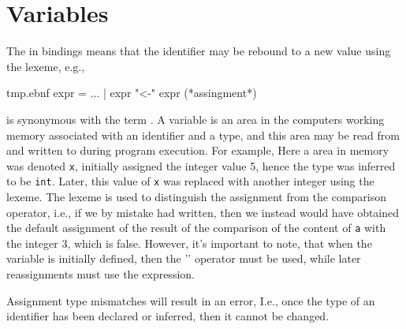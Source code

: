 \section{Variables}
\label{sec:mutableValues}
The  in  bindings means that the identifier may be rebound to a new value using the \idxs{\lexeme{<-}} lexeme, e.g.,
%
\begin{verbatimwrite}{tmp.ebnf}
expr = ...
  | expr "<-" expr (*assingment*)
\end{verbatimwrite}
%
 is synonymous with the term . A variable is an area in the computers working memory associated with an identifier and a type, and this area may be read from and written to during program execution. For example,
%
%
Here a area in memory was denoted \texttt{x}, initially assigned the integer value 5, hence the type was inferred to be \lstinline|int|.  Later, this value of \texttt{x} was replaced with another integer using the \idx{\lexeme{<-}} lexeme. The \lexeme{<-} lexeme is used to distinguish the assignment from the comparison operator, i.e., if we by mistake had written,
%
%
%
then we instead would have obtained the default assignment of the result of the comparison of the content of \lstinline|a| with the integer 3, which is false. However, it's important to note, that when the variable is initially defined, then the '\lexeme{=}' operator must be used, while later reassignments must use the \lexeme{<-} expression.

Assignment type mismatches will result in an error, 
%
%
I.e., once the type of an identifier has been declared or inferred, then it cannot be changed.

